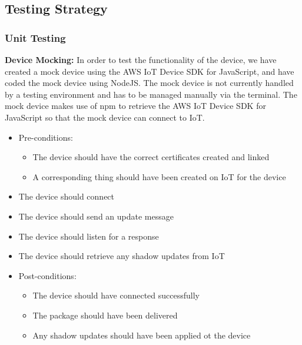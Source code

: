 \documentclass{article}
\begin{document}
	\subsection{Testing Strategy}
		\subsubsection{Unit Testing}
			\textbf{Device Mocking:}
			In order to test the functionality of the device, we have created a mock device using the AWS IoT Device SDK for JavaScript, and have coded the mock device using NodeJS. The mock device is not currently handled by a testing environment and has to be managed manually via the terminal. The mock device makes use of npm to retrieve the AWS IoT Device SDK for JavaScript so that the mock device can connect to IoT.
			\begin{itemize}
				\item Pre-conditions:
					\begin{itemize}
						\item The device should have the correct certificates created and linked
						\item A corresponding thing should have been created on IoT for the device
					\end{itemize}
				\item The device should connect
				\item The device should send an update message
				\item The device should listen for a response
				\item The device should retrieve any shadow updates from IoT
				\item Post-conditions:
					\begin{itemize}
						\item The device should have connected successfully
						\item The package should have been delivered 
						\item Any shadow updates should have been applied ot the device
					\end{itemize}
			\end{itemize}
			
\end{document}
